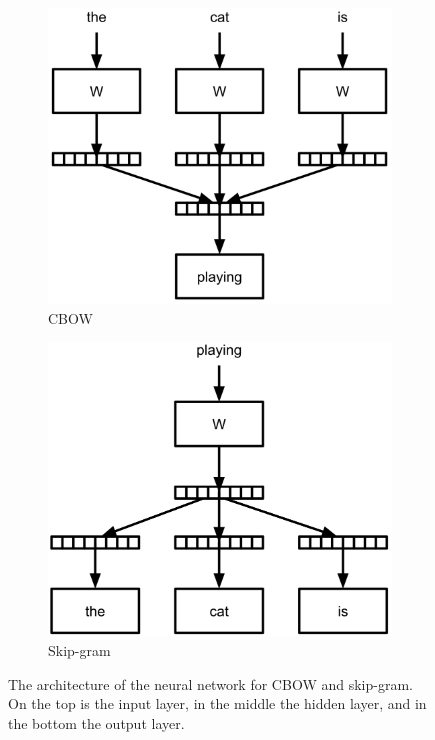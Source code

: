 \begin{figure}
	\centering
	\begin{subfigure}{.5\textwidth}
		\centering
		\includegraphics[width=1.0\linewidth]{3preliminaries/cbow}
		\caption{CBOW}
		\label{fig:3:cbow}
	\end{subfigure}\begin{subfigure}{.5\textwidth}
		\centering
		\includegraphics[width=1.0\linewidth]{3preliminaries/sg}
		\caption{Skip-gram}
		\label{fig:3:sg}
	\end{subfigure}
	\caption{The architecture of the neural network for CBOW and skip-gram. On the top is the input layer, in the middle the hidden layer, and in the bottom the output layer.}
	\label{fig:3:cbow-sg}
\end{figure}

